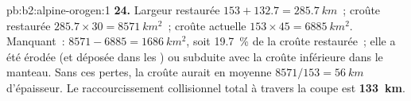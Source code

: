 \begin{solution}{pb:b2:alpine-orogen:1}
\textbf{24.} Largeur restaurée $153 + 132.7 = \qty{285.7}{km}$~; croûte restaurée
$285.7\times30 = \qty{8571}{km^2}$~; croûte actuelle $153\times45 = \qty{6885}{km^2}$. Manquant~:
$8571 - 6885 = \qty{1686}{km^2}$, soit \qty{19.7}{\percent} de la croûte restaurée~; elle a été
érodée (et déposée dans les ) ou subduite avec la croûte inférieure dans le
manteau. Sans ces pertes, la croûte aurait en moyenne $8571/153 = \qty{56}{km}$ d'épaisseur.
Le raccourcissement collisionnel total à travers la coupe est
\textbf{\qty[text-series-to-math=true]{133}{km}}.
\end{solution}
